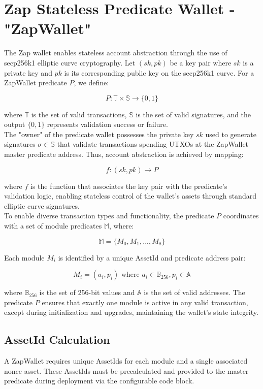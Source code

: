 \newpage
\section{Zap Stateless Predicate Wallet - {\ttfamily "ZapWallet"}}
\label{sec:predi_wal}

The Zap wallet enables stateless account abstraction through the use of secp256k1 elliptic curve cryptography. Let $(sk, pk)$ be a key
pair where $sk$ is a private key and $pk$ is its corresponding public key on the secp256k1 curve. For a ZapWallet predicate $P$, we define:

\[ P: \mathbb{T} \times \mathbb{S} \rightarrow \{0,1\} \]

where $\mathbb{T}$ is the set of valid transactions, $\mathbb{S}$ is the set of valid signatures, and the output $\{0,1\}$ represents
validation success or failure.\\

The "owner" of the predicate wallet possesses the private key $sk$ used to generate signatures $\sigma \in \mathbb{S}$ that validate
transactions spending UTXOs at the ZapWallet master predicate address. Thus, account abstraction is achieved by mapping:

\[ f: (sk, pk) \rightarrow P \]

where $f$ is the function that associates the key pair with the predicate's validation logic, enabling stateless control of the
wallet's assets through standard elliptic curve signatures.\\

To enable diverse transaction types and functionality, the predicate $P$ coordinates with a set of module predicates $\mathbb{M}$, where:

\[ \mathbb{M} = \{M_0, M_1, ..., M_8\} \]

Each module $M_i$ is identified by a unique AssetId and predicate address pair:

\[ M_i = (a_i, p_i) \text{ where } a_i \in \mathbb{B}_{256}, p_i \in \mathbb{A} \]

where $\mathbb{B}_{256}$ is the set of 256-bit values and $\mathbb{A}$ is the set of valid addresses. The predicate $P$ ensures that
exactly one module is active in any valid transaction, except during initialization and upgrades, maintaining the wallet's state integrity.







\subsection{AssetId Calculation}
A ZapWallet requires unique AssetIds for each module and a single associated nonce asset. These AssetIds must be precalculated
and provided to the master predicate during deployment via the configurable code block.

